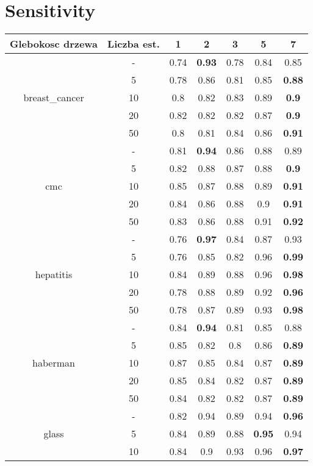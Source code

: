 \documentclass{article}%
\begin{document}
\section*{Sensitivity}%
\begin{longtable}{c|c|ccccc}%
\hline%
Glebokosc drzewa&Liczba est.&1&2&3&5&7\\%
\hline%
\multirow{5}{*}{breast\_cancer}&{-}&0.74&\textbf{0.93}&0.78&0.84&0.85\\%
\cline{2%
-%
7}%
&5&0.78&0.86&0.81&0.85&\textbf{0.88}\\%
\cline{2%
-%
7}%
&10&0.8&0.82&0.83&0.89&\textbf{0.9}\\%
\cline{2%
-%
7}%
&20&0.82&0.82&0.82&0.87&\textbf{0.9}\\%
\cline{2%
-%
7}%
&50&0.8&0.81&0.84&0.86&\textbf{0.91}\\%
\hline%
\multirow{5}{*}{cmc}&{-}&0.81&\textbf{0.94}&0.86&0.88&0.89\\%
\cline{2%
-%
7}%
&5&0.82&0.88&0.87&0.88&\textbf{0.9}\\%
\cline{2%
-%
7}%
&10&0.85&0.87&0.88&0.89&\textbf{0.91}\\%
\cline{2%
-%
7}%
&20&0.84&0.86&0.88&0.9&\textbf{0.91}\\%
\cline{2%
-%
7}%
&50&0.83&0.86&0.88&0.91&\textbf{0.92}\\%
\hline%
\multirow{5}{*}{hepatitis}&{-}&0.76&\textbf{0.97}&0.84&0.87&0.93\\%
\cline{2%
-%
7}%
&5&0.76&0.85&0.82&0.96&\textbf{0.99}\\%
\cline{2%
-%
7}%
&10&0.84&0.89&0.88&0.96&\textbf{0.98}\\%
\cline{2%
-%
7}%
&20&0.78&0.88&0.89&0.92&\textbf{0.96}\\%
\cline{2%
-%
7}%
&50&0.78&0.87&0.89&0.93&\textbf{0.98}\\%
\hline%
\multirow{5}{*}{haberman}&{-}&0.84&\textbf{0.94}&0.81&0.85&0.88\\%
\cline{2%
-%
7}%
&5&0.85&0.82&0.8&0.86&\textbf{0.89}\\%
\cline{2%
-%
7}%
&10&0.87&0.85&0.84&0.87&\textbf{0.89}\\%
\cline{2%
-%
7}%
&20&0.85&0.84&0.82&0.87&\textbf{0.89}\\%
\cline{2%
-%
7}%
&50&0.84&0.82&0.82&0.87&\textbf{0.89}\\%
\hline%
\multirow{5}{*}{glass}&{-}&0.82&0.94&0.89&0.94&\textbf{0.96}\\%
\cline{2%
-%
7}%
&5&0.84&0.89&0.88&\textbf{0.95}&0.94\\%
\cline{2%
-%
7}%
&10&0.84&0.9&0.93&0.96&\textbf{0.97}\\%

\end{longtable}
\end{document}

